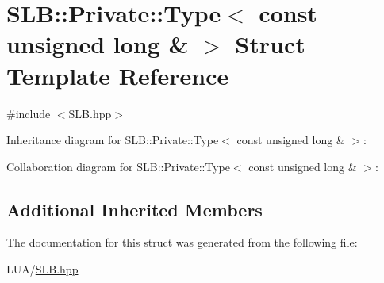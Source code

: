\hypertarget{structSLB_1_1Private_1_1Type_3_01const_01unsigned_01long_01_6_01_4}{}\section{S\+LB\+:\+:Private\+:\+:Type$<$ const unsigned long \& $>$ Struct Template Reference}
\label{structSLB_1_1Private_1_1Type_3_01const_01unsigned_01long_01_6_01_4}


{\ttfamily \#include $<$S\+L\+B.\+hpp$>$}



Inheritance diagram for S\+LB\+:\+:Private\+:\+:Type$<$ const unsigned long \& $>$\+:


Collaboration diagram for S\+LB\+:\+:Private\+:\+:Type$<$ const unsigned long \& $>$\+:
\subsection*{Additional Inherited Members}


The documentation for this struct was generated from the following file\+:\begin{DoxyCompactItemize}
\item 
L\+U\+A/\hyperlink{SLB_8hpp}{S\+L\+B.\+hpp}\end{DoxyCompactItemize}
